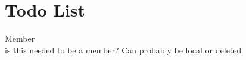 \chapter{Todo List}
\hypertarget{todo}{}\label{todo}

\begin{DoxyRefList}
\item[Member \doxylink{classAprsTransmitter_ad76d55d881f736fdaa7c1b21a0521b1e}{Aprs\+Transmitter\+::current\+Sample\+Value} ]\hfill \\
\label{todo__todo000002}%
%
is this needed to be a member? Can probably be local or deleted 
\end{DoxyRefList}